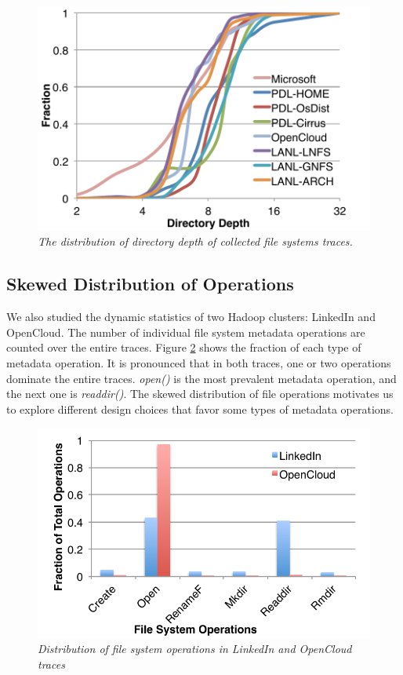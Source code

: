\begin{figure}[!ht]
\center
\includegraphics[scale=0.4]{figs/directory_depth}
\caption{\textit{The distribution of directory depth of
collected file systems traces.}}
\label{fig:directory_depth}
\end{figure}

\subsection{Skewed Distribution of Operations}

We also studied the dynamic statistics of two Hadoop clusters:
LinkedIn and OpenCloud. The number of individual file system
metadata operations are counted over the entire traces.
Figure \ref{fig:operation} shows the fraction of each type
of metadata operation. It is pronounced that in both traces,
one or two operations dominate the entire traces.
\textit{open()} is the most prevalent metadata operation,
and the next one is \textit{readdir()}.
The skewed distribution of file operations motivates us to
explore different design choices that favor some types
of metadata operations.

\begin{figure}[!ht]
\center
\includegraphics[scale=0.5]{figs/operation_distribution}
\caption{\textit{Distribution of file system operations in
LinkedIn and OpenCloud traces}}
\label{fig:operation}
\end{figure}
